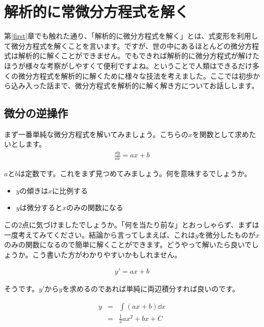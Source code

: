 \chapter{解析的に常微分方程式を解く}
\label{analytical-ordinary}

第\ref{first}章でも触れた通り、「解析的に微分方程式を解く」とは、式変形を利用して微分方程式を解くことを言います。ですが、世の中にあるほとんどの微分方程式は解析的に解くことができません。でもできれば解析的に微分方程式が解けたほうが様々な考察がしやすくて便利ですよね。ということで人類はできるだけ多くの微分方程式を解析的に解くために様々な技法を考えました。ここでは初歩から込み入った話まで、微分方程式を解析的に解く解き方についてお話しします。







\section{微分の逆操作}
\label{integrate}
まず一番単純な微分方程式を解いてみましょう。こちらの$x$を関数として求めたいとします。
\begin{eqnarray}
    \frac{\dd y}{\dd x}=ax+b
\end{eqnarray}

$a$と$b$は定数です。これをまず見つめてみましょう。何を意味するでしょうか。

\begin{itemize}
    \item $y$の傾きは$x$に比例する
    \item $y$は微分すると$x$のみの関数になる
\end{itemize}

この2点に気づけましたでしょうか。「何を当たり前な」とおっしゃらず、まずは一度考えてみてください。結論から言ってしまえば、これは$y$を微分したものが$x$のみの関数になるので簡単に解くことができます。どうやって解いたら良いでしょうか。こう書いた方がわかりやすいかもしれません。

\begin{eqnarray}
    \label{eq:integrate}
    y'=ax+b
\end{eqnarray}

\noindent
そうです。$y'$から$y$を求めるのであれば単純に両辺積分すれば良いのです。

\begin{eqnarray}
    y&=&\int(ax+b)\dd x \\
    &=&\frac{1}{2}ax^2+bx+C
\end{eqnarray}

